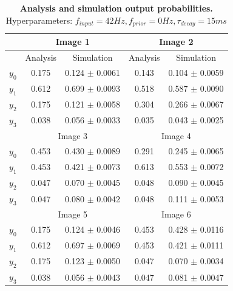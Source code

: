 \begin{table}[]
\centering
\label{tab:1D_42_0_15}
\small
\tabcolsep=0.11cm
\begin{tabular}{|c|cc|cc|}
\hline
                       & \multicolumn{2}{c|}{Image 1}                       & \multicolumn{2}{c|}{Image 2}                       \\ \hline
                       & \multicolumn{1}{c|}{Analysis} & Simulation         & \multicolumn{1}{c|}{Analysis} & Simulation         \\ \hline
$y_0$                  & \multicolumn{1}{c|}{0.175}    & 0.124 $\pm$ 0.0061 & \multicolumn{1}{c|}{0.143}    & 0.104 $\pm$ 0.0059 \\ \hline
$y_1$                  & \multicolumn{1}{c|}{0.612}    & 0.699 $\pm$ 0.0093 & \multicolumn{1}{c|}{0.518}    & 0.587 $\pm$ 0.0090 \\ \hline
$y_2$                  & \multicolumn{1}{c|}{0.175}    & 0.121 $\pm$ 0.0058 & \multicolumn{1}{c|}{0.304}    & 0.266 $\pm$ 0.0067 \\ \hline
$y_3$                  & \multicolumn{1}{c|}{0.038}    & 0.056 $\pm$ 0.0033 & \multicolumn{1}{c|}{0.035}    & 0.043 $\pm$ 0.0025 \\ \hline
                       & \multicolumn{2}{c|}{Image 3}                       & \multicolumn{2}{c|}{Image 4}                       \\ \hline
$y_0$                  & \multicolumn{1}{c|}{0.453}    & 0.430 $\pm$ 0.0089 & \multicolumn{1}{c|}{0.291}    & 0.245 $\pm$ 0.0065 \\ \hline
$y_1$                  & \multicolumn{1}{c|}{0.453}    & 0.421 $\pm$ 0.0073 & \multicolumn{1}{c|}{0.613}    & 0.553 $\pm$ 0.0072 \\ \hline
$y_2$                  & \multicolumn{1}{c|}{0.047}    & 0.070 $\pm$ 0.0045 & \multicolumn{1}{c|}{0.048}    & 0.090 $\pm$ 0.0045 \\ \hline
$y_3$                  & \multicolumn{1}{c|}{0.047}    & 0.080 $\pm$ 0.0042 & \multicolumn{1}{c|}{0.048}    & 0.111 $\pm$ 0.0053 \\ \hline
						& \multicolumn{2}{c|}{Image 5}                       & \multicolumn{2}{c|}{Image 6}                       \\ \hline
$y_0$                  & \multicolumn{1}{c|}{0.175}    & 0.124 $\pm$ 0.0046 & \multicolumn{1}{c|}{0.453}    & 0.428 $\pm$ 0.0116 \\ \hline
$y_1$                  & \multicolumn{1}{c|}{0.612}    & 0.697 $\pm$ 0.0069 & \multicolumn{1}{c|}{0.453}    & 0.421 $\pm$ 0.0111 \\ \hline
$y_2$                  & \multicolumn{1}{c|}{0.175}    & 0.123 $\pm$ 0.0050 & \multicolumn{1}{c|}{0.047}    & 0.070 $\pm$ 0.0034 \\ \hline
$y_3$                  & \multicolumn{1}{c|}{0.038}    & 0.056 $\pm$ 0.0043 & \multicolumn{1}{c|}{0.047}    & 0.081 $\pm$ 0.0047 \\ \hline
\end{tabular}
\caption{\textbf{Analysis and simulation output probabilities. } Hyperparameters: $f_{input} = 42 Hz, f_{prior} = 0 Hz, \tau_{decay} = 15 ms$}
\end{table}


